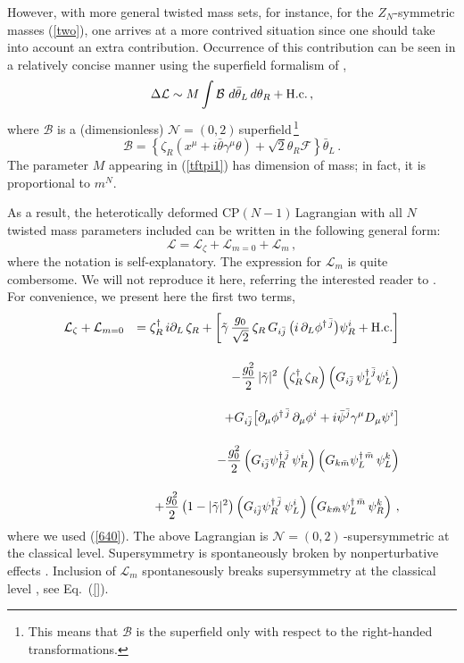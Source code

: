 \documentclass[epsfig,12pt]{article}
\def\beq{\begin{equation}}
\def\eeq{\end{equation}}
\def\beqn{\begin{eqnarray}}
\def\eeqn{\end{eqnarray}}
\newcommand{\nzt}{${\mathcal N}=(0,2)\,$}
\newcommand{\cpn}{CP$(N-1)\,$}
\newcommand{\cell}{{\mathcal L}}
\newcommand{\zn}{$Z_N$}
\def\beqn{\begin{eqnarray}}
\def\eeqn{\end{eqnarray}}
\def\beq{\begin{equation}}
\def\eeq{\end{equation}}
\begin{document}
However, with more general twisted mass sets,
for instance, for the \zn-symmetric masses (\ref{two}), 
one arrives at a more contrived situation since 
one should take into account an extra contribution.
Occurrence of this contribution can be seen \cite{BSY3} in a relatively concise
manner using the superfield formalism of \cite{SY1},
\beq
\Delta\cell \sim M\int  {\mathcal B}\,\,  d\bar\theta_L \, d\theta_R + {\rm H. c.}\,,
\label{tftpi1}
\eeq
where
${\mathcal B}$ is a (dimensionless) \nzt superfield\,\footnote{This means that ${\mathcal B}$
is the superfield only with respect to the right-handed transformations.}
\beq
{\mathcal B} =\left\{\zeta_R\left(x^\mu + i\bar\theta\gamma^\mu\theta\right) +\sqrt{2} \theta_R {\mathcal F}
\right\} \bar\theta_L\,.
\label{tftpi2}
\eeq
 The parameter $M$ appearing in (\ref{tftpi1}) has dimension of mass; in fact, it is proportional to $m^N$.
 
 As a result, the heterotically deformed \cpn Lagrangian with all $N$ twisted mass parameters included
can be written in the following general form:
 \beq
 \cell = \cell_\zeta + \cell_{m=0} +\cell_m\,,
 \label{tftpi3}
 \eeq
 where the notation is self-explanatory. The expression for $\cell_m$ is quite combersome.
 We will not reproduce it here, referring the interested reader to \cite{BSY3}.
 For convenience, we present here the first two terms,
\beqn
\cell_\zeta + \cell_{m=0} && 
= 
\zeta_R^\dagger \, i\partial_L \, \zeta_R  + 
\left[\tilde\gamma\, \frac{g_0}{\sqrt 2} \, \zeta_R  \, G_{i\bar j}\,  \big( i\,\partial_{L}\phi^{\dagger\,\bar j} \big)\psi_R^i
+{\rm H.c.}\right]
\nonumber
\\[4mm]
&&
 -\frac{g_0^2}{2}\, |\tilde\gamma |^2 \,\left(\zeta_R^\dagger\, \zeta_R
\right)\left(G_{i\bar j}\,  \psi_L^{\dagger\,\bar j}\psi_L^i\right)
\nonumber
\\[4mm]
&&
+G_{i\bar j} \big[\partial_\mu \phi^{\dagger\,\bar j}\, \partial_\mu\phi^{i}
+i\bar \psi^{\bar j} \gamma^{\mu} D_{\mu}\psi^{i}\big]
\nonumber
\\[4mm]
&&
- \frac{g_0^2}{2}\left( G_{i\bar j}\psi^{\dagger\, \bar j}_R\, \psi^{ i}_R\right)
\left( G_{k\bar m}\psi^{\dagger\, \bar m}_L\, \psi^{ k}_L\right)
\nonumber
\\[4mm]
&&
+\frac{g_0^2}{2}\left(1-|\tilde\gamma|^2\right)
\left( G_{i\bar j}\psi^{\dagger\, \bar j}_R\, \psi^{ i}_L\right)
\left( G_{k\bar m}\psi^{\dagger\, \bar m}_L\, \psi^{ k}_R\right)\,,
\label{cpn-1g}
\eeqn
where we used (\ref{640}). The above Lagrangian is \nzt-supersymmetric at the classical level.
Supersymmetry is spontaneously broken by nonperturbative effects \cite{EdTo,SYhet}. 
Inclusion of $\cell_m$ spontanesously breaks supersymmetry at the classical level \cite{BSY3}, see
Eq.~(\ref{}).
\end{document}
